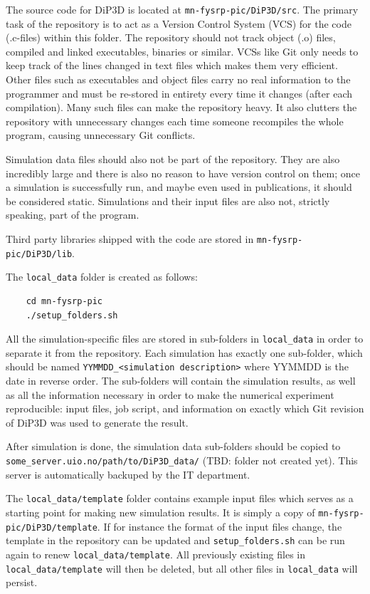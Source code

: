 \documentclass[10pt,a4paper]{article}
\begin{document}
The source code for DiP3D is located at \lstinline$mn-fysrp-pic/DiP3D/src$. The primary task of the repository is to act as a Version Control System (VCS) for the code (.c-files) within this folder. The repository should not track object (.o) files, compiled and linked executables, binaries or similar. VCSs like Git only needs to keep track of the lines changed in text files which makes them very efficient. Other files such as executables and object files carry no real information to the programmer and must be re-stored in entirety every time it changes (after each compilation). Many such files can make the repository heavy. It also clutters the repository with unnecessary changes each time someone recompiles the whole program, causing unnecessary Git conflicts.

Simulation data files should also not be part of the repository. They are also incredibly large and there is also no reason to have version control on them; once a simulation is successfully run, and maybe even used in publications, it should be considered static. Simulations and their input files are also not, strictly speaking, part of the program.

Third party libraries shipped with the code are stored in \lstinline$mn-fysrp-pic/DiP3D/lib$.

The \lstinline$local_data$ folder is created as follows:

\begin{lstlisting}
	cd mn-fysrp-pic
	./setup_folders.sh
\end{lstlisting}

All the simulation-specific files are stored in sub-folders in \lstinline$local_data$ in order to separate it from the repository. Each simulation has exactly one sub-folder, which should be named \lstinline$YYMMDD_<simulation description>$ where YYMMDD is the date in reverse order. The sub-folders will contain the simulation results, as well as all the information necessary in order to make the numerical experiment reproducible: input files, job script, and information on exactly which Git revision of DiP3D was used to generate the result.

After simulation is done, the simulation data sub-folders should be copied to \lstinline$some_server.uio.no/path/to/DiP3D_data/$ (TBD: folder not created yet). This server is automatically backuped by the IT department.

The \lstinline$local_data/template$ folder contains example input files which serves as a starting point for making new simulation results. It is simply a copy of \lstinline$mn-fysrp-pic/DiP3D/template$. If for instance the format of the input files change, the template in the repository can be updated and \lstinline$setup_folders.sh$ can be run again to renew \lstinline$local_data/template$. All previously existing files in \lstinline$local_data/template$ will then be deleted, but all other files in \lstinline$local_data$ will persist.
\end{document}
